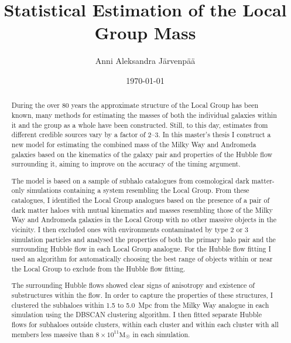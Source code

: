 \documentclass[english, twoside]{HYgradu}
\title{Statistical Estimation of the Local Group Mass}
\author{Anni Aleksandra Järvenpää}
\date{\today}
\begin{document}
\maketitle

\onehalfspacing

\begin{abstract}
During the over 80 years the approximate structure of the Local Group has been known, many methods for estimating the masses of both the individual galaxies within it and the group as a whole have been constructed. Still, to this day, estimates from different credible sources vary by a factor of 2--3. In this master's thesis I construct a new model for estimating the combined mass of the Milky Way and Andromeda galaxies based on the kinematics of the galaxy pair and properties of the Hubble flow surrounding it, aiming to improve on the accuracy of the timing argument.


The model is based on a sample of subhalo catalogues from cosmological dark matter-only simulations containing a system resembling the Local Group. From these catalogues, I identified the Local Group analogues based on the presence of a pair of dark matter haloes with mutual kinematics and masses resembling those of the Milky Way and Andromeda galaxies in the Local Group with no other massive objects in the vicinity. I then excluded ones with environments contaminated by type 2 or 3 simulation particles and analysed the properties of both the primary halo pair and the surrounding Hubble flow in each Local Group analogue. For the Hubble flow fitting I used an algorithm for automatically choosing the best range of objects within or near the Local Group to exclude from the Hubble flow fitting.

The surrounding Hubble flows showed clear signs of anisotropy and existence of substructures within the flow. In order to capture the properties of these structures, I clustered the subhaloes within 1.5 to 5.0~Mpc from the Milky Way analogue in each simulation using the DBSCAN clustering algorithm. I then fitted separate Hubble flows for subhaloes outside clusters, within each cluster and within each cluster with all members less massive than $8 \times 10^{11} \mathrm{M}_{\astrosun}$ in each simulation.


\end{abstract}
\end{document}
